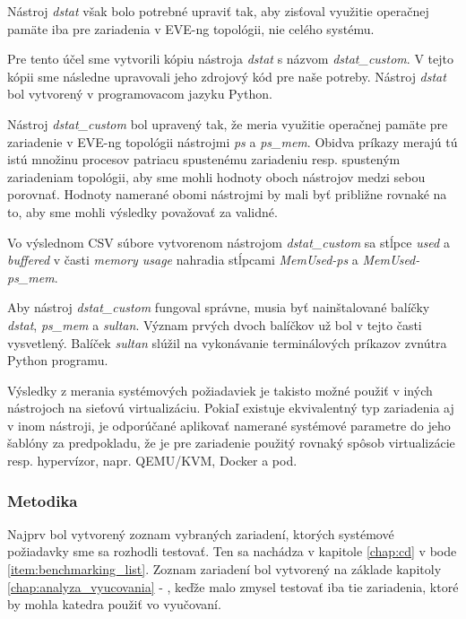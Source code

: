 Nástroj \emph{dstat} však bolo potrebné upraviť tak, aby zisťoval využitie operačnej pamäte iba pre zariadenia v EVE-ng topológii, nie celého systému.

Pre tento účel sme vytvorili kópiu nástroja \emph{dstat} s názvom \emph{dstat\_custom}. V tejto kópii sme následne upravovali jeho zdrojový kód pre naše potreby. Nástroj \emph{dstat} bol vytvorený v programovacom jazyku Python.

Nástroj \emph{dstat\_custom} bol upravený tak, že meria využitie operačnej pamäte pre zariadenie v EVE-ng topológii nástrojmi \emph{ps} a \emph{ps\_mem}. Obidva príkazy merajú tú istú množinu procesov patriacu spustenému zariadeniu resp. spusteným zariadeniam topológii, aby sme mohli hodnoty oboch nástrojov medzi sebou porovnať. Hodnoty namerané obomi nástrojmi by mali byť približne rovnaké na to, aby sme mohli výsledky považovať za validné.

Vo výslednom CSV súbore vytvorenom nástrojom \emph{dstat\_custom} sa stĺpce \emph{used} a \emph{buffered} v časti \emph{memory usage} nahradia stĺpcami \emph{MemUsed-ps} a \emph{MemUsed-ps\_mem}.

Aby nástroj \emph{dstat\_custom} fungoval správne, musia byť nainštalované balíčky \emph{dstat}, \emph{ps\_mem} a \emph{sultan}. Význam prvých dvoch balíčkov už bol v tejto časti vysvetlený. Balíček \emph{sultan} slúžil na vykonávanie terminálových príkazov zvnútra Python programu.

Výsledky z merania systémových požiadaviek je takisto možné použiť v iných nástrojoch na sieťovú virtualizáciu. Pokiaľ existuje ekvivalentný typ zariadenia aj v inom nástroji, je odporúčané aplikovať namerané systémové parametre do jeho šablóny za predpokladu, že je pre zariadenie použitý rovnaký spôsob virtualizácie resp. hypervízor, napr. QEMU/KVM, Docker a pod.





\subsubsection{Metodika}

Najprv bol vytvorený zoznam vybraných zariadení, ktorých systémové požiadavky sme sa rozhodli testovať. Ten sa nachádza v kapitole \ref{chap:cd} v bode \ref{item:benchmarking_list}. Zoznam zariadení bol vytvorený na základe kapitoly \ref{chap:analyza_vyucovania} - , keďže malo zmysel testovať iba tie zariadenia, ktoré by mohla katedra použiť vo vyučovaní.

